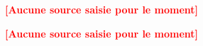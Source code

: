 \textcolor{red}{\textbf{[Aucune source saisie pour le moment]}}

\textcolor{red}{\textbf{[Aucune source saisie pour le moment]}}
